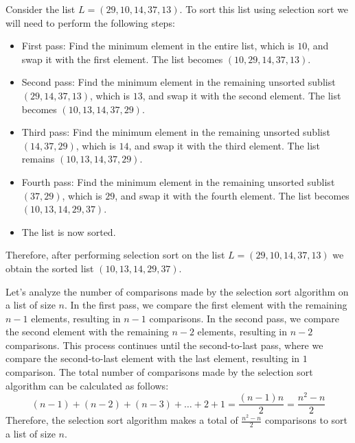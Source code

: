 \begin{eg}
    Consider the list $L = (29, 10, 14, 37, 13)$. To sort this list using selection sort we will need to perform the following steps:
    \begin{itemize}[itemsep=1pt,label=$\circ$]
        \item First pass: Find the minimum element in the entire list, which is $10$, and swap it with the first element. The list becomes $(10, 29, 14, 37, 13)$.
        \item Second pass: Find the minimum element in the remaining unsorted sublist $(29, 14, 37, 13)$, which is $13$, and swap it with the second element. The list becomes $(10, 13, 14, 37, 29)$.
        \item Third pass: Find the minimum element in the remaining unsorted sublist $(14, 37, 29)$, which is $14$, and swap it with the third element. The list remains $(10, 13, 14, 37, 29)$.
        \item Fourth pass: Find the minimum element in the remaining unsorted sublist $(37, 29)$, which is $29$, and swap it with the fourth element. The list becomes $(10, 13, 14, 29, 37)$.
        \item The list is now sorted.
    \end{itemize}
    Therefore, after performing selection sort on the list $L = (29, 10, 14, 37, 13)$ we obtain the sorted list $(10, 13, 14, 29, 37)$.
\end{eg}

\begin{eg}
    Let's analyze the number of comparisons made by the selection sort algorithm on a list of size $n$. In the first pass, we compare the first element with the remaining $n-1$ elements, resulting in $n-1$ comparisons. In the second pass, we compare the second element with the remaining $n-2$ elements, resulting in $n-2$ comparisons. This process continues until the second-to-last pass, where we compare the second-to-last element with the last element, resulting in $1$ comparison. The total number of comparisons made by the selection sort algorithm can be calculated as follows:
    \[(n-1) + (n-2) + (n-3) + \ldots + 2 + 1 = \frac{(n-1)n}{2} = \frac{n^2 - n}{2}\]
    Therefore, the selection sort algorithm makes a total of $\frac{n^2 - n}{2}$ comparisons to sort a list of size $n$.
\end{eg}

